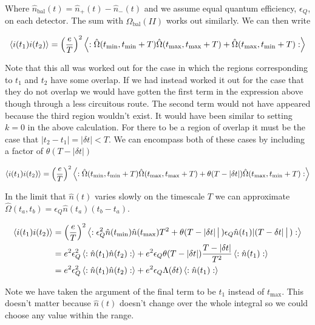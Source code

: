 \documentclass[12pt]{article}
\begin{document}
Where $\hat{n}_{\text{bal}}(t) = \hat{n}_+(t) - \hat{n}_-(t)$ and we assume equal quantum efficiency, $\epsilon_Q$, on each detector.
The sum with $\hat{\Omega}_{\text{bal}}(II)$ works out similarly. We can then write

\begin{align}
\Braket{i(t_1)i(t_2)} = \left(\frac{e}{T}\right)^2 \Braket{:\hat{\Omega}(t_{\text{min}},t_{\text{min}}+T)\hat{\Omega}(t_{\text{max}},t_{\text{max}}+T) + \hat{\Omega}(t_{\text{max}},t_{\text{min}}+T) :}
\end{align}

Note that this all was worked out for the case in which the regions corresponding to $t_1$ and $t_2$ have some overlap. If we had instead worked it out for the case that they do not overlap we would have gotten the first term in the expression above though through a less circuitous route. The second term would not have appeared because the third region wouldn't exist. It would have been similar to setting $k=0$ in the above calculation. For there to be a region of overlap it must be the case that $|t_2-t_1|=|\delta t|<T$. We can encompass both of these cases by including a factor of $\theta(T-\lvert\delta t \rvert)$

\begin{align}
\Braket{i(t_1)i(t_2)} = \left(\frac{e}{T}\right)^2 \Braket{:\hat{\Omega}(t_{\text{min}},t_{\text{min}}+T)\hat{\Omega}(t_{\text{max}},t_{\text{max}}+T) + \theta(T-\lvert\delta t\rvert) \hat{\Omega}(t_{\text{max}},t_{\text{min}}+T) :}
\end{align}

In the limit that $\hat{n}(t)$ varies slowly on the timescale $T$ we can approximate $\hat{\Omega}(t_a,t_b) = \epsilon_Q \hat{n}(t_a) (t_b-t_a)$.

\begin{align}
\Braket{i(t_1)i(t_2)} &= \left(\frac{e}{T}\right)^2 \Braket{:\epsilon_Q^2\hat{n}(t_{\text{min}})\hat{n}(t_{\text{max}})T^2 + \theta(T-\lvert \delta t\rvert|)\epsilon_Q\hat{n}(t_1)\lvert (T-\delta t \rvert|):}\\
&=e^2 \epsilon_Q^2 \Braket{:\hat{n}(t_1)\hat{n}(t_2):} + e^2 \epsilon_Q \theta(T-\lvert \delta t\rvert) \frac{T-\lvert \delta t\rvert}{T^2} \braket{:\hat{n}(t_1):}\\
&=e^2 \epsilon_Q^2 \Braket{:\hat{n}(t_1)\hat{n}(t_2):} + e^2 \epsilon_Q \Lambda(\delta t) \braket{:\hat{n}(t_1):}
\end{align}

Note we have taken the argument of the final term to be $t_1$ instead of $t_{\text{max}}$. This doesn't matter because $\hat{n}(t)$ doesn't change over the whole integral so we could choose any value within the range.
\end{document}
